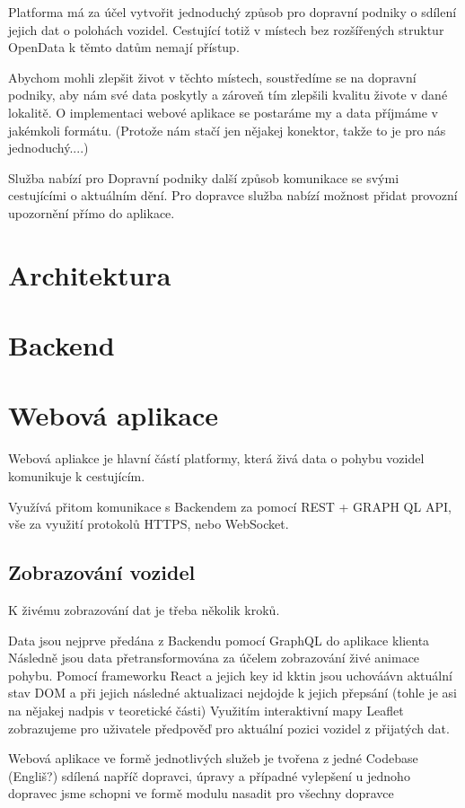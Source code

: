Platforma má za účel vytvořit jednoduchý způsob pro dopravní podniky o sdílení jejich dat o polohách vozidel.
Cestující totiž v místech bez rozšířených struktur OpenData k těmto datům nemají přístup.

Abychom mohli zlepšit život v těchto místech, soustředíme se na dopravní podniky, aby nám své data poskytly a zároveň tím zlepšili kvalitu živote v dané lokalitě.
O implementaci webové aplikace se postaráme my a data příjmáme v jakémkoli formátu. (Protože nám stačí jen nějakej konektor, takže to je pro nás jednoduchý....)

Služba nabízí pro Dopravní podniky další způsob komunikace se svými cestujícími o aktuálním dění. Pro dopravce služba nabízí možnost přidat provozní upozornění přímo do aplikace.

\section{Architektura}

\section{Backend}

\section{Webová aplikace}

Webová apliakce je hlavní částí platformy, která živá data o pohybu vozidel komunikuje k cestujícím.

Využívá přitom komunikace s Backendem za pomocí REST + GRAPH QL API, vše za využití protokolů HTTPS, nebo WebSocket.

\subsection{Zobrazování vozidel}
K živému zobrazování dat je třeba několik kroků.

Data jsou nejprve předána z Backendu pomocí GraphQL do aplikace klienta
Následně jsou data přetransformována za účelem zobrazování živé animace pohybu.
Pomocí frameworku React a jejich key id kktin jsou uchováávn aktuální stav DOM a při jejich následné aktualizaci nejdojde k jejich přepsání (tohle je asi na nějakej nadpis v teoretické části)
Využitím interaktivní mapy Leaflet zobrazujeme pro uživatele předpověď pro aktuální pozici vozidel z přijatých dat.


Webová aplikace ve formě jednotlivých služeb je tvořena z jedné Codebase (Engliš?) sdílená napříč dopravci, úpravy a případné vylepšení u jednoho dopravec jsme schopni ve formě modulu nasadit pro všechny dopravce

